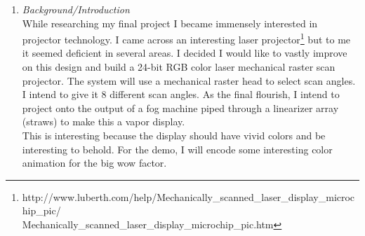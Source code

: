 \documentclass[12pt]{article}
\begin{document}
\begin{enumerate}
\item
\emph{Background/Introduction}\\
While researching my final project I became immensely interested in projector technology.
I came across an interesting laser projector\footnote{
    http://www.luberth.com/help/Mechanically\_scanned\_laser\_display\_microchip\_pic/\\Mechanically\_scanned\_laser\_display\_microchip\_pic.htm}
but to me it seemed deficient in several areas.
I decided I would like to vastly improve on this design and build a 24-bit RGB
color laser mechanical raster scan projector.
The system will use a mechanical raster head to select scan angles. I intend to give it
8 different scan angles.
As the final flourish, I intend to project onto the output of a fog machine piped through a
linearizer array (straws) to make this a vapor display.\\
This is interesting because the display should have vivid colors and be interesting to behold.
For the demo, I will encode some interesting color animation for the big wow factor.



\end{enumerate}
\end{document}

